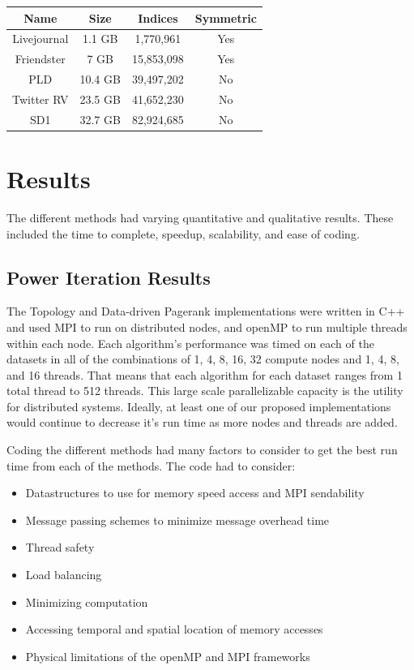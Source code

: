 \documentclass[letterpaper,11pt,onecolumn]{article}
\begin{document}
\begin{center}
  \begin{tabular}{ c | c  | c | c }
    \hline
    Name & Size & Indices & Symmetric \\ \hline \hline
    Livejournal & 1.1 GB & 1,770,961 & Yes \\ \hline
    Friendster & 7 GB & 15,853,098 & Yes \\ \hline
    PLD & 10.4 GB & 39,497,202 & No \\ \hline
    Twitter RV & 23.5 GB & 41,652,230 & No \\ \hline
    SD1 & 32.7 GB & 82,924,685 & No \\
    \hline
  \end{tabular}
  \label{table:data}
\end{center}



\section{Results}
The different methods had varying quantitative and qualitative results. These included the time to complete, speedup, scalability, and ease of coding. 

\subsection{Power Iteration Results}

The Topology and Data-driven Pagerank implementations were written in C++ and used MPI to run on distributed nodes, and openMP to run multiple threads within each node. Each algorithm’s performance was timed on each of the datasets in all of the combinations of 1, 4, 8, 16, 32 compute nodes and 1, 4, 8, and 16 threads. That means that each algorithm for each dataset ranges from 1 total thread to 512 threads. This large scale parallelizable capacity is the utility for distributed systems. Ideally, at least one of our proposed implementations would continue to decrease it's run time as more nodes and threads are added.

Coding the different methods had many factors to consider to get the best run time from each of the methods. The code had to consider:

\begin{itemize}
  \item Datastructures to use for memory speed access and MPI sendability
  \item Message passing schemes to minimize message overhead time
  \item Thread safety
  \item Load balancing
  \item Minimizing computation
  \item Accessing temporal and spatial location of memory accesses
  \item Physical limitations of the openMP and MPI frameworks
\end{itemize}
\end{document}
